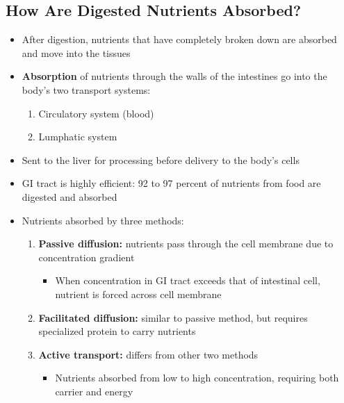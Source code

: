 \documentclass[12pt]{article}
\begin{document}
        \subsection{How Are Digested Nutrients Absorbed?}
            \begin{itemize}
                \item After digestion, nutrients that have completely broken down are absorbed and move into the tissues
                \item \textbf{Absorption} of nutrients through the walls of the intestines go into the body's two transport systems:
                    \begin{enumerate}
                        \item Circulatory system (blood)
                        \item Lumphatic system
                    \end{enumerate}
                \item Sent to the liver for processing before delivery to the body's cells
                \item GI tract is highly efficient: 92 to 97 percent of nutrients from food are digested and absorbed
                \item Nutrients absorbed by three methods:
                    \begin{enumerate}
                        \item \textbf{Passive diffusion:} nutrients pass through the cell membrane due to concentration gradient
                            \begin{itemize}
                                \item When concentration in GI tract exceeds that of intestinal cell, nutrient is forced across cell membrane
                            \end{itemize}
                        \item \textbf{Facilitated diffusion:} similar to passive method, but requires specialized protein to carry nutrients
                        \item \textbf{Active transport:} differs from other two methods
                            \begin{itemize}
                                \item Nutrients absorbed from low to high concentration, requiring both carrier and energy
                            \end{itemize}
                    \end{enumerate}
            \end{itemize}
\end{document}
